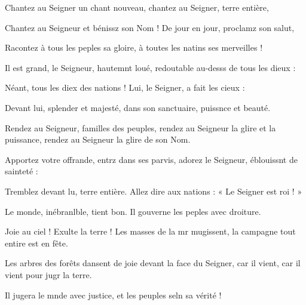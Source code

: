 \item Chantez au Seigner un chant nouveau,\psstar{} chantez au Seigner, terre entière,
\item Chantez au Seigneur et bénissz son Nom !\psstar{} De jour en jour, proclamz son salut,
\item Racontez à tous les peples sa gloire,\psstar{} à toutes les natins ses merveilles !
\item Il est grand, le Seigneur, hautemnt loué,\psstar{} redoutable au-desss de tous les dieux :
\item Néant, tous les diex des nations !\psstar{} Lui, le Seigner, a fait les cieux :
\item Devant lui, splender et majesté,\psstar{} dans son sanctuaire, puissnce et beauté.
\item Rendez au Seigneur, familles des peuples,\pscross{} rendez au Seigneur la glire et la puissance,\psstar{} rendez au Seigneur la glire de son Nom. 
\item Apportez votre offrande, entrz dans ses parvis,\psstar{} adorez le Seigneur, éblouissnt de sainteté : 
\item Tremblez devant lu, terre entière.\psstar{} Allez dire aux nations : « Le Seigner est roi ! » 
\item Le monde, inébranlble, tient bon.\psstar{} Il gouverne les peples avec droiture.
\item Joie au ciel ! Exulte la terre !\pscross{} Les masses de la mr mugissent,\psstar{} la campagne tout entire est en fête. 
\item Les arbres des forêts dansent de joie\pscross{} devant la face du Seigner, car il vient,\psstar{} car il vient pour jugr la terre. 
\item Il jugera le mnde avec justice,\psstar{} et les peuples seln sa vérité !